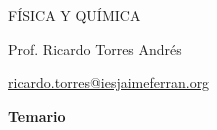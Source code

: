 \documentclass[a4paper,14pt]{extarticle}
\title{\textbf{	}}
\date{}
\begin{document}
{}

\vspace*{-2cm}

\begin{center}
\Huge  FÍSICA Y QUÍMICA
\vspace{.2cm}

{\large
Prof. Ricardo Torres Andrés
}
\vspace{-7mm}

{\normalsize
\href{mailto:ricardo.torres@iesjaimeferran.org}{ricardo.torres@iesjaimeferran.org}
}
\end{center}
\vspace{.3cm}

\begin{mdframed}[backgroundcolor=gray!20]  
\center
{\Large\bfseries Temario}
\end{mdframed}

\vspace{.2cm}
\end{document}
